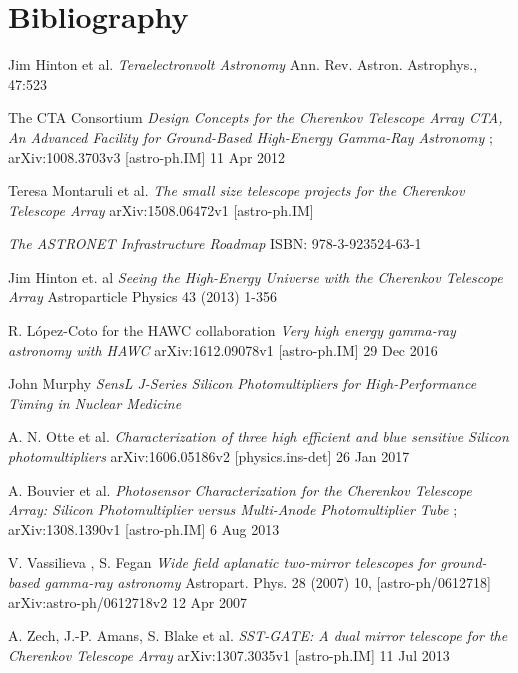 \documentclass[12pt,article,type=msc,colorback,accentcolor=tud9c]{tudthesis}
\begin{document}
\section{\Large Bibliography}
\begin{thebibliography}{12}

 Jim Hinton et al. \textit{Teraelectronvolt Astronomy} Ann. Rev. Astron. Astrophys., 47:523



 The CTA Consortium \textit{Design Concepts for the Cherenkov Telescope Array CTA, An Advanced Facility for Ground-Based High-Energy Gamma-Ray Astronomy} ; arXiv:1008.3703v3 [astro-ph.IM] 11 Apr 2012

 Teresa Montaruli et al. \textit{The small size telescope projects for the Cherenkov Telescope Array} arXiv:1508.06472v1 [astro-ph.IM]

 \textit{The ASTRONET Infrastructure Roadmap} ISBN: 978-3-923524-63-1

 Jim Hinton et. al \textit{Seeing the High-Energy Universe with the Cherenkov Telescope Array} Astroparticle Physics 43 (2013) 1-356 

 R. L\'opez-Coto for the HAWC collaboration \textit{Very high energy gamma-ray astronomy with HAWC} arXiv:1612.09078v1 [astro-ph.IM] 29 Dec 2016

 John Murphy \textit{SensL J-Series Silicon Photomultipliers for High-Performance Timing in Nuclear Medicine}

 A. N. Otte et al. \textit{Characterization of three high efficient and blue sensitive Silicon photomultipliers} arXiv:1606.05186v2 [physics.ins-det] 26 Jan 2017

  A. Bouvier et al. \textit{Photosensor Characterization for the Cherenkov Telescope Array: Silicon Photomultiplier versus Multi-Anode Photomultiplier Tube} ; arXiv:1308.1390v1 [astro-ph.IM] 6 Aug 2013

 V. Vassilieva , S. Fegan \textit{Wide field aplanatic two-mirror telescopes for ground-based gamma-ray astronomy} Astropart. Phys. 28 (2007) 10, [astro-ph/0612718] arXiv:astro-ph/0612718v2 12 Apr 2007

 A. Zech, J.-P. Amans, S. Blake et al. \textit{SST-GATE: A dual mirror telescope for the Cherenkov Telescope Array} arXiv:1307.3035v1 [astro-ph.IM] 11 Jul 2013


\end{thebibliography}
\end{document}
